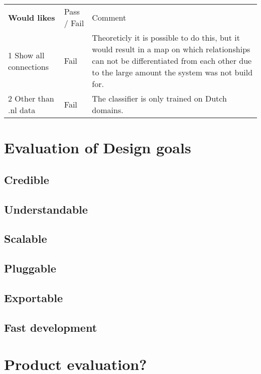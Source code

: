 \begin{table}[]
\begin{tabular}{ll m{8cm}}
\textbf{Would likes}                    & Pass / Fail & Comment                                                                                                                                                                                                                               \\
1 Show all connections         & Fail        & Theoreticly it is possible to do this, but it would result in a map on which relationships can not be differentiated from each other due to the large amount the system was not build for. \\
2 Other than .nl data          & Fail        & The classifier is only trained on Dutch domains.                                                                 
\end{tabular}
\end{table}

\section{Evaluation of Design goals}

\subsection{Credible}

\subsection{Understandable}

\subsection{Scalable}

\subsection{Pluggable}

\subsection{Exportable}

\subsection{Fast development}

\section{Product evaluation?}



